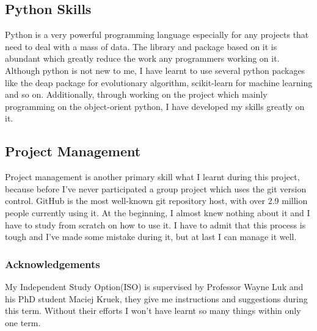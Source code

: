 \documentclass[11pt, runningheads,a4paper]{llncs}
\begin{document}
\subsection{Python Skills}
Python is a very powerful programming language especially for any projects that need to deal with a mass of data. The library and package based on it is abundant which greatly reduce the work any programmers working on it. Although python is not new to me, I have learnt to use several python packages like the deap package for evolutionary algorithm, scikit-learn for machine learning and so on. Additionally, through working on the project which mainly programming on the object-orient python, I have developed my skills greatly on it.

\subsection{Project Management}
Project management is another primary skill what I learnt during this project, because before I've never participated a group project which uses the git version control. GitHub is the most well-known git repository host, with over 2.9 million people currently using it. At the beginning, I almost knew nothing about it and I have to study from scratch on how to use it. I have to admit that this process is tough and I've made some mistake during it, but at last I can manage it well.


\subsubsection*{Acknowledgements}
My Independent Study Option(ISO) is supervised by Professor Wayne Luk and his PhD student Maciej Kruek,  they give me instructions and suggestions during this term. Without their efforts I won't have learnt so many things within only one term. 
 



%
\end{document}
